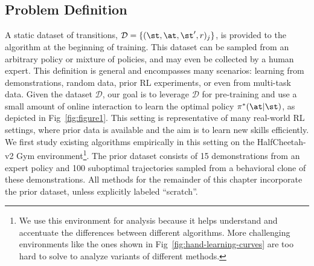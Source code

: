 \subsection{Problem Definition} \label{sec:challenges_setting}
A static dataset of transitions, \mbox{$\mathcal{D} = \{(\st, \at, \st', r)_j\}$}, is provided to the algorithm at the beginning of training. This dataset can be sampled from an arbitrary policy or mixture of policies, and may even be collected by a human expert. This definition is general and encompasses many scenarios: learning from demonstrations, random data, prior RL experiments, or even from multi-task data. Given the dataset $\mathcal{D}$, our goal is to leverage $\mathcal{D}$ for pre-training and use a small amount of online interaction to learn the optimal policy $\pi^*(\at|\st)$, as depicted in Fig~\ref{fig:figure1}. This setting is representative of many real-world RL settings, where prior data is available and the aim is to learn new skills efficiently. We first study existing algorithms empirically in this setting on the HalfCheetah-v2 Gym environment\footnote{We use this environment for analysis because it helps understand and accentuate the differences between different algorithms. More challenging environments like the ones shown in Fig~\ref{fig:hand-learning-curves}
are too hard to solve to analyze variants of different methods.}. The prior dataset consists of 15 demonstrations from an expert policy and 100 suboptimal trajectories sampled from a behavioral clone of these demonstrations. All methods for the remainder of this chapter incorporate the prior dataset, unless explicitly labeled ``scratch''.



